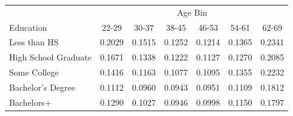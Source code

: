 \begin{tabular}{lcccccc}
\hline\hline
 & \multicolumn{6}{c}{Age Bin} \\
Education & 22-29 & 30-37 & 38-45 & 46-53 & 54-61 & 62-69 \\
\hline
Less than HS&0.2029&0.1515&0.1252&0.1214&0.1365&0.2341\\
High School Graduate&0.1671&0.1338&0.1222&0.1127&0.1270&0.2085\\
Some College&0.1416&0.1163&0.1077&0.1095&0.1355&0.2232\\
Bachelor's Degree&0.1112&0.0960&0.0943&0.0951&0.1109&0.1812\\
Bachelors+&0.1290&0.1027&0.0946&0.0998&0.1150&0.1797\\
\hline\hline
\end{tabular}
